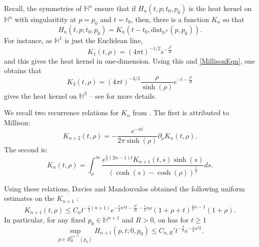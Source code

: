 \documentclass{amsart}
\theoremstyle{definition}
\theoremstyle{remark}
\numberwithin{equation}{section}
\newcommand{\dist}[0]{\mathrm{dist}}
\begin{document}
Recall, the symmetries of $\mathbb{H}^n$ ensure that if $H_n(t,p; t_0, p_0)$ is the heat kernel on $\mathbb{H}^n$ with singularitity at $p=p_0$ and $t=t_0$, then, there is a function $K_n$ so that
$$
H_n(t,p; t_0, p_0)=K_n(t-t_0, \dist_{\mathbb{H}^n}(p,p_0)).
$$
For instance, as $\mathbb{H}^1$ is just the Euclidean line,
$$
K_1(t,\rho)=(4\pi t)^{-1/2}e^{-\frac{\rho^2}{4t}}
$$
and this gives the heat kernel in one-dimension.
Using this and \eqref{MillisonEqn}, one obtains that
$$
K_3(t,\rho)=(4\pi t)^{-3/2}\frac{\rho}{\sinh(\rho)}e^{-t-\frac{\rho^2}{4t}}
$$
gives the heat kernel on $\mathbb{H}^3$ -- see \cite{daviesHeatKernelBounds1988} for more details.

We recall two recurrence relations for $K_n$ from \cite{daviesHeatKernelBounds1988}.
The first is attributed to Millison:
\begin{equation}\label{MillisonEqn}
K_{n+2}(t,\rho) =-\frac{e^{-nt}}{2\pi \sinh(\rho)} \partial_\rho K_n(t,\rho).
\end{equation}
The second is:
\begin{equation} \label{IntegralEqn}
K_{n}(t,\rho)=\int_{\rho}^\infty \frac{e^{\frac{1}{4}\left(2n-1\right)t}K_{n+1}(t,s) \sinh(s)}{\left(\cosh(s)-\cosh(\rho)\right)^{\frac{1}{2}}} ds.
\end{equation}

Using these relations, Davies and Mandouvalos obtained the following uniform estimates on the $K_{n+1}$ \cite[Thereom 3.1]{daviesHeatKernelBounds1988}:
\begin{equation}\label{KnDecayEst}
K_{n+1}(t,\rho)\leq C_n t^{-\frac{1}{2}(n+1)}e^{-\frac{1}{4}n^2 t-\frac{\rho^2}{4t}-\frac{1}{2}n\rho} (1+\rho+t)^{\frac{1}{2}n -1} (1+\rho).
\end{equation}
In particular, for any fixed $p_0\in \mathbb{H}^{n+1}$ and $R>0$, on has for $t\geq 1$
\begin{equation}\label{TimeDecayEqn}
\sup_{p\in B_{R}^{\mathbb{H}^{n+1}}(p_0)} H_{n+1}(p,t; 0, p_0)\leq C_{n,R}' t^{-\frac{3}{2}} e^{-\frac{1}{4}n^2 t}.
\end{equation}
\end{document}

